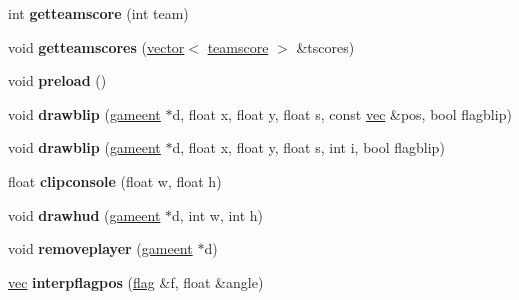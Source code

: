 \begin{DoxyCompactItemize}
\mbox{\label{structgame_1_1ctfclientmode_ab5dbd2735af415bcb0a597320c790eaa}} 
int {\bfseries getteamscore} (int team)
\item 
\mbox{\label{structgame_1_1ctfclientmode_ab7992a1e6f9fb12772da680805f9475b}} 
void {\bfseries getteamscores} (\hyperlink{structvector}{vector}$<$ \hyperlink{structteamscore}{teamscore} $>$ \&tscores)
\item 
\mbox{\label{structgame_1_1ctfclientmode_ad520d9265826fe936033214dc428c7b5}} 
void {\bfseries preload} ()
\item 
\mbox{\label{structgame_1_1ctfclientmode_a940391bc159c4a12c699d77ef5eb6578}} 
void {\bfseries drawblip} (\hyperlink{structgameent}{gameent} $\ast$d, float x, float y, float s, const \hyperlink{structvec}{vec} \&pos, bool flagblip)
\item 
\mbox{\label{structgame_1_1ctfclientmode_a81452c4cb60058ac5dd7ffb4e674ef38}} 
void {\bfseries drawblip} (\hyperlink{structgameent}{gameent} $\ast$d, float x, float y, float s, int i, bool flagblip)
\item 
\mbox{\label{structgame_1_1ctfclientmode_a606b98f2a28c915e16024aba15db3f3b}} 
float {\bfseries clipconsole} (float w, float h)
\item 
\mbox{\label{structgame_1_1ctfclientmode_a3976554f84e2d260e4da9b3e52567ff2}} 
void {\bfseries drawhud} (\hyperlink{structgameent}{gameent} $\ast$d, int w, int h)
\item 
\mbox{\label{structgame_1_1ctfclientmode_a6b3d77137c0362115886345b98668229}} 
void {\bfseries removeplayer} (\hyperlink{structgameent}{gameent} $\ast$d)
\item 
\mbox{\label{structgame_1_1ctfclientmode_ad93dc199a60060b4df3df677697d09a6}} 
\hyperlink{structvec}{vec} {\bfseries interpflagpos} (\hyperlink{structgame_1_1ctfclientmode_1_1flag}{flag} \&f, float \&angle)
\item 
\mbox{\label{structgame_1_1ctfclientmode_aa9bb0e001cef74a9f674044e3721b8c7}} 

\end{DoxyCompactItemize}
